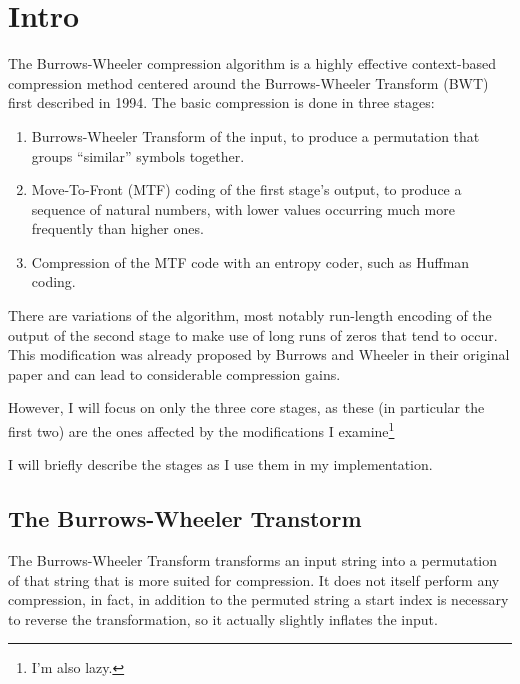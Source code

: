 \documentclass[a4paper]{scrreprt}
\begin{document}
\begin{abstract}
\end{abstract}
\chapter{Intro}


The Burrows-Wheeler compression algorithm is a highly effective context-based
compression method centered around the Burrows-Wheeler Transform (BWT) first
described in 1994\cite{burrowswheeler1994bwt}.
The basic compression is done in three stages:
\begin{enumerate}
  \item Burrows-Wheeler Transform of the input, to produce a permutation that
  groups ``similar'' symbols together.
  \item Move-To-Front (MTF) coding of the first stage's output, to produce a
  sequence of natural numbers, with lower values occurring much more frequently
  than higher ones.
  \item Compression of the MTF code with an entropy coder, such as Huffman
  coding.
\end{enumerate}
There are variations of the algorithm, most notably run-length encoding of the
output of the second stage to make use of long runs of zeros that tend to occur.
This modification was already proposed by Burrows and Wheeler in their original
paper and can lead to considerable compression gains.

However, I will focus on only the three core stages, as these (in particular
the first two) are the ones affected by the modifications I
examine\footnote{I'm also lazy.}

I will briefly describe the stages as I use them in my implementation.

\section{The Burrows-Wheeler Transtorm}

The Burrows-Wheeler Transform transforms an input string into a permutation of
that string that is more suited for compression. It does not itself perform any
compression, in fact, in addition to the permuted string a start index is
necessary to reverse the transformation, so it actually slightly inflates the
input.
\end{document}
